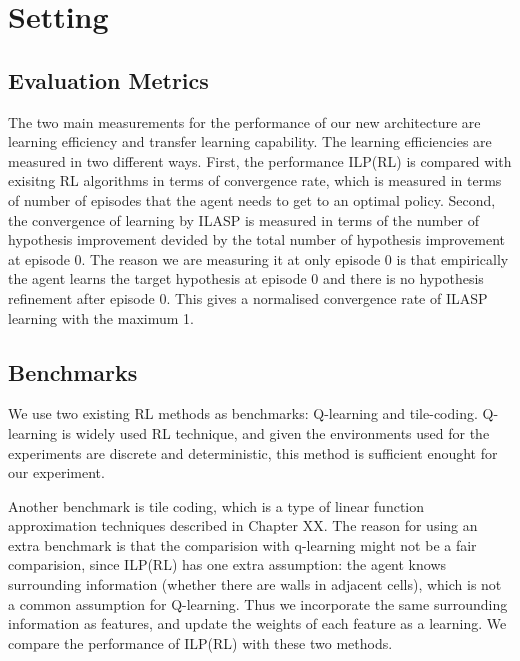 \section{Setting}
\label{sec:setting}

\subsection{Evaluation Metrics}
\label{subsec:evaluation_metrics}

The two main measurements for the performance of our new architecture are learning efficiency and transfer learning capability.
The learning efficiencies are measured in two different ways. First, the performance ILP(RL) is compared with exisitng RL algorithms in terms of
convergence rate, which is measured in terms of number of episodes that the agent needs to get to an optimal policy.
Second, the convergence of learning by ILASP is measured in terms of the number of hypothesis improvement devided by the total number of hypothesis improvement at episode 0.
The reason we are measuring it at only episode 0 is that empirically the agent learns the target hypothesis at episode 0 and there is no hypothesis refinement after episode 0.
This gives a normalised convergence rate of ILASP learning with the maximum 1.

\subsection{Benchmarks}
\label{subsec:benchmarks}

We use two existing RL methods as benchmarks: Q-learning and tile-coding.
Q-learning is widely used RL technique, and given the environments used for the experiments are discrete and deterministic, this method is sufficient enought for our experiment.

Another benchmark is tile coding, which is a type of linear function approximation techniques described in Chapter XX.
The reason for using an extra benchmark is that the comparision with q-learning might not be a fair comparision,
since ILP(RL) has one extra assumption: the agent knows surrounding information (whether there are walls in adjacent cells),
which is not a common assumption for Q-learning. Thus we incorporate the same surrounding information as features, and update the weights of each feature as a learning.
We compare the performance of ILP(RL) with these two methods.

